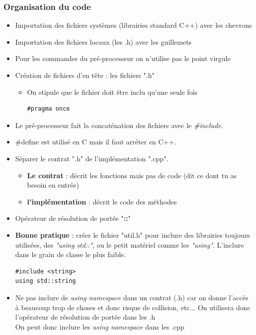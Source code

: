 \documentclass[12pt,a4paper]{article}
\begin{document}
\subsubsection{Organisation du code}
\begin{itemize}
\item Importation des fichiers systèmes (librairies standard C++) avec les chevrons
\item Importation des fichiers locaux (les .h) avec les guillemets
\item Pour les commandes du pré-processeur on n'utilise pas le point virgule
\item Création de fichiers d'en tête : les fichiers ".h"
\begin{itemize}
\item On stipule que le fichier doit être inclu qu'une seule fois
\begin{lstlisting}
#pragma once
\end{lstlisting}
\end{itemize}
\item Le pré-processeur fait la concaténation des fichiers avec le \textit{\#include}.
\item \#define est utilisé en C mais il faut arréter en C++.
\item Séparer le contrat ".h" de l'implémentation ".cpp".
\begin{itemize}
\item \textbf{Le contrat} : décrit les fonctions mais pas de code (dit ce dont tu as besoin en entrée)
\item \textbf{l'implémentation} : décrit le code des méthodes
\end{itemize}
\item Opérateur de résolution de portée "\textbf{::}"
\item \textbf{Bonne pratique} : créer le fichier "util.h" pour inclure des librairies toujours utilisées, des \textit{"using std::"}, ou le petit matériel comme les \textit{"using"}. L'inclure dans le grain de classe le plus faible.
\begin{lstlisting}
#include <string>
using std::string
\end{lstlisting}
\item Ne pas inclure de \textit{using namespace} dans un contrat (.h) car on donne l'accès à beaucoup trop de choses et donc risque de collision, etc... On utilisera donc l'opérateur de résolution de portée dans les .h\\
On peut donc inclure les \textit{using namespace} dans les .cpp

\end{itemize}
\end{document}
